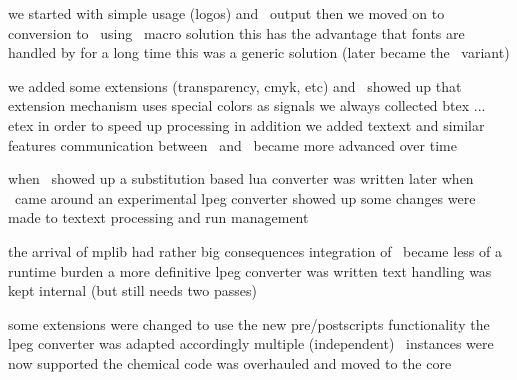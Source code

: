 

\startdocument
  [title=MetaPost,
   subtitle=how we adapt,
   location=\ConTeXt\ Meeting 2011]


\StartSteps
\startitemize
\startitem we started with simple usage (logos) and \POSTSCRIPT\ output \stopitem \FlushStep
\startitem then we moved on to conversion to \PDF\ using \TEX\ macro solution \stopitem \FlushStep
\startitem this has the advantage that fonts are handled by \TEX \stopitem \FlushStep
\startitem for a long time this was a generic solution (later became the \MKII\ variant) \stopitem \FlushStep
\stopitemize
\StopSteps


\StartSteps
\startitemize
\startitem we added some extensions (transparency, cmyk, etc) and \METAFUN\ showed up \stopitem \FlushStep
\startitem that extension mechanism uses special colors as signals \stopitem \FlushStep
\startitem we always collected btex ... etex in order to speed up processing \stopitem \FlushStep
\startitem in addition we added textext and similar features \stopitem \FlushStep
\startitem communication between \METAFUN\ and \CONTEXT\ became more advanced over time \stopitem \FlushStep
\stopitemize
\StopSteps


\StartSteps
\startitemize
\startitem when \LUATEX\ showed up a substitution based lua converter was written \stopitem \FlushStep
\startitem later when \LPEG\ came around an experimental lpeg converter showed up \stopitem \FlushStep
\startitem some changes were made to textext processing and run management \stopitem \FlushStep
\stopitemize
\StopSteps


\StartSteps
\startitemize
\startitem the arrival of mplib had rather big consequences \stopitem \FlushStep
\startitem integration of \METAFUN\ became less of a runtime burden \stopitem \FlushStep
\startitem a more definitive lpeg converter was written \stopitem \FlushStep
\startitem text handling was kept internal (but still needs two passes) \stopitem \FlushStep
\stopitemize
\StopSteps


\StartSteps
\startitemize
\startitem some extensions were changed to use the new pre/postscripts functionality \stopitem \FlushStep
\startitem the lpeg converter was adapted accordingly \stopitem \FlushStep
\startitem multiple (independent) \METAPOST\ instances were now supported \stopitem \FlushStep
\startitem the chemical code was overhauled and moved to the core \stopitem \FlushStep
\stopitemize
\StopSteps

